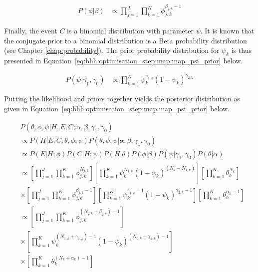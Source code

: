 \begin{equation}
      \label{eq:bhh:optimisation_step:map:map_phi_prior}
      \begin{split}
            P(\phi \vert \beta)
            &\propto \prod_{j=1}^{J}  \prod_{k=1}^{K} \phi_{j,k}^{\beta_{j,k} -1}
      \end{split}
\end{equation}

Finally, the event $C$ is a binomial distribution with parameter $\psi$. It is known that the conjugate prior to a binomial distribution is a Beta probability distribution (see Chapter \ref{chap:probability}). The prior probability distribution for $\psi_{k}$ is thus presented in Equation~\eqref{eq:bhh:optimisation_step:map:map_psi_prior} below.

\begin{equation}
      \label{eq:bhh:optimisation_step:map:map_psi_prior}
      \begin{split}
            P(\psi | \gamma_{1}, \gamma_{0})
            &\propto \prod_{k=1}^{K} \psi_{k}^{\gamma_{1,k}} (1- \psi_{k})^{\gamma_{2,k}}
      \end{split}
\end{equation}

Putting the likelihood and priors together yields the posterior distribution as given in Equation~\eqref{eq:bhh:optimisation_step:map:map_psi_prior} below.

\begin{equation}
      \label{eq:bhh:optimisation_step:map:posterior}
      \begin{split}
            & P(\theta, \phi, \psi \vert H, E, C;  \alpha, \beta, \gamma_{1}, \gamma_{0}) \\
            &\propto P(H \vert E, C; \theta, \phi, \psi)P(\theta, \phi, \psi \vert \alpha, \beta, \gamma_{1}, \gamma_{0}) \\
            &\propto P(E \vert H; \phi) P(C \vert H; \psi) P(H \vert \theta) P(\phi \vert \beta) P(\psi \vert \gamma_{1}, \gamma_{0}) P(\theta \vert \alpha)  \\
            &\propto \left[ \prod_{j=1}^{J} \prod_{k=1}^{K} \phi_{j,k}^{N_{j,k}} \right] \left[ \prod_{k=1}^{K} \psi_{k}^{N_{1,k}} (1 - \psi_{k})^{(N_{k} - N_{1,k})} \right] \left[ \prod_{k=1}^{K} \theta_{k}^{N_{k}} \right] \\
            &\times \left[ \prod_{j=1}^{J} \prod_{k=1}^{K} \phi_{j,k}^{\beta_{j,k} - 1} \right] \left[ \prod_{k=1}^{K} \psi_{k}^{\gamma_{1,k} - 1} (1 - \psi_{k})^{\gamma_{2,k} - 1} \right] \left[ \prod_{k=1}^{K} \theta_{k}^{\alpha_{k} - 1} \right] \\
            &\propto \left[ \prod_{j=1}^{J} \prod_{k=1}^{K} \phi_{j,k}^{(N_{j,k} + \beta_{j,k}) - 1} \right] \\
            &\times \left[ \prod_{k=1}^{K} \psi_{k}^{(N_{1,k} + \gamma_{1,k}) - 1} (1 - \psi_{k})^{(N_{0,k} + \gamma_{2,k} )- 1} \right] \\
            &\times \left[ \prod_{k=1}^{K} \theta_{k}^{(N_{k} + \alpha_{k}) - 1} \right]
      \end{split}
\end{equation}

